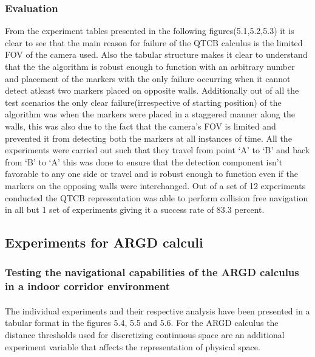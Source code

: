 \subsubsection*{Evaluation} From the experiment tables presented in the following figures(5.1,5.2,5.3) it is clear to see that the main reason for failure of the QTCB calculus is the limited FOV of the camera used. Also the tabular structure makes it clear to understand that the the algorithm is robust enough to function with an arbitrary number and placement of the markers with the only failure occurring when it cannot detect atleast two markers placed on opposite walls. Additionally out of all the test scenarios the only clear failure(irrespective of starting position) of the algorithm was when the markers were placed in a staggered manner along the walls, this was also due to the fact that the camera's FOV is limited and prevented it from detecting both the markers at all instances of time. All the experiments were carried out such that they travel from point `A' to `B' and back from `B' to `A' this was done to ensure that the detection component isn't favorable to any one side or travel and is robust enough to function even if the markers on the opposing walls were interchanged. Out of a set of 12 experiments conducted the QTCB representation was able to perform collision free navigation in all but 1 set of experiments giving it a success rate of 83.3 percent.

\subsection{Experiments for ARGD calculi}
\subsubsection{Testing the navigational capabilities of the ARGD calculus in a indoor corridor environment} 
\paragraph{}The individual experiments and their respective analysis have been presented in a tabular format in the figures 5.4, 5.5 and 5.6. For the ARGD calculus the distance thresholds used for discretizing continuous space are an additional experiment variable that affects the representation of physical space.

